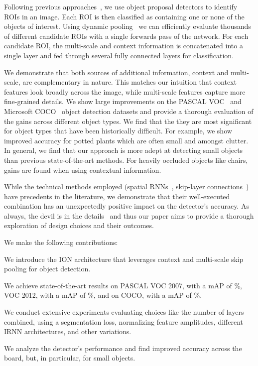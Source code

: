 \documentclass[10pt,twocolumn,letterpaper]{article}
\begin{document}
Following previous approaches~\cite{girshick2014rcnn}, we use object proposal
detectors \cite{Hosang15proposals,UijlingsIJCV2013,edgeboxes} to identify ROIs in
an image. Each ROI is then classified as containing one or none of the objects of
interest. Using dynamic pooling~\cite{sppnet} we can efficiently evaluate
thousands of different candidate ROIs with a single forwards pass of the
network. For each candidate ROI, the multi-scale and context information is
concatenated into a single layer and fed through several fully connected layers
for classification.

We demonstrate that both sources of additional information, context and
multi-scale, are complementary in nature. This matches our intuition that
context features look broadly across the image, while multi-scale features
capture more fine-grained details. We show large improvements on the PASCAL
VOC~\cite{pascal} and Microsoft COCO~\cite{coco} object detection datasets and
provide a thorough evaluation of the gains across different object types.  We
find that the they are most significant for object types that have been
historically difficult. For example, we show improved accuracy for potted plants
which are often small and amongst clutter. In general, we find that our
approach is more adept at detecting small objects than previous
state-of-the-art methods.  For heavily occluded objects like chairs, gains are
found when using contextual information.

While the technical methods employed (spatial
RNNs~\cite{nd-rnn,sceneLSTM,renet}, skip-layer
connections~\cite{sermanetCVPR13,parsenet,fcn,hariharan2015hypercolumns}) have
precedents in the literature, we demonstrate that their well-executed
combination has an unexpectedly positive impact on the detector's accuracy.  As
always, the devil is in the details~\cite{Chatfield14} and thus our paper aims
to provide a thorough exploration of design choices and their
outcomes.

We make the following contributions:
\begin{packed_enum}
\item We introduce the ION architecture that leverages context and multi-scale
  skip pooling for object detection.

\item We achieve state-of-the-art results on PASCAL VOC 2007, with a mAP of
  \BestVOCSevenTest{}\%, VOC 2012, with a mAP of \BestVOCTwelveTest{}\%,
  and on COCO, with a mAP of \BestCOCOTest{}\%.

\item We conduct extensive experiments evaluating choices like the number of
layers combined, using a segmentation loss, normalizing feature amplitudes,
different IRNN architectures, and other variations.

\item We analyze the detector's performance and find improved accuracy across
the board, but, in particular, for small objects.
\end{packed_enum}%
\end{document}
